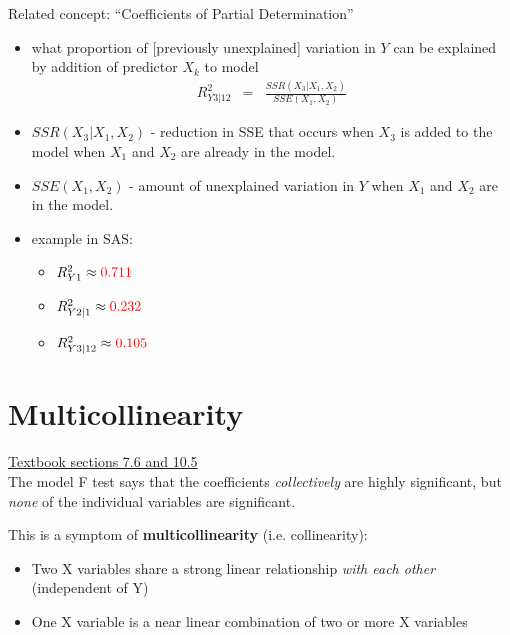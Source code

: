\documentclass[12pt]{../notes}
\begin{document}
Related concept: ``Coefficients of Partial Determination''
\begin{itemize}
  \item what proportion of [previously unexplained] variation in $Y$
  can be explained by addition of predictor $X_k$ to model
    \begin{eqnarray}
      R^2_{Y3|12} & = & \frac{SSR(X_3 | X_1, X_2)}{SSE(X_1,X_2)}
      \nonumber
    \end{eqnarray}
    
    \bi
    \item $SSR(X_3 | X_1, X_2)$ - reduction in SSE that occurs when $X_3$ is added to the model when $X_1$ and $X_2$ are already in the model. 
    \item $SSE(X_1, X_2)$ - amount of unexplained variation in $Y$ when $X_1$ and $X_2$ are in the model. 
    \ei
    
  \item example in SAS:
    \begin{itemize}
       \item $R^2_{Y1} \approx {\color{red} 0.711}$
       \item $R^2_{Y2|1} \approx {\color{red} 0.232}$
       \item $R^2_{Y3|12} \approx {\color{red} 0.105}$
    \end{itemize}
\end{itemize}

\begin{minipage}[l][3cm][c]{\textwidth}
\end{minipage}

\section{Multicollinearity}
\underline{Textbook sections 7.6 and 10.5}\\

The model F test says that the coefficients \textit{collectively} are highly significant, but \textit{none} of the individual variables are significant. 

\nspace
This is a symptom of \textbf{multicollinearity} (i.e. collinearity):
\begin{itemize}
\item Two X variables share a strong linear relationship \textit{with each other} (independent of Y)
\item One X variable is a near linear combination of two or more X variables 
\end{itemize}
\end{document}

